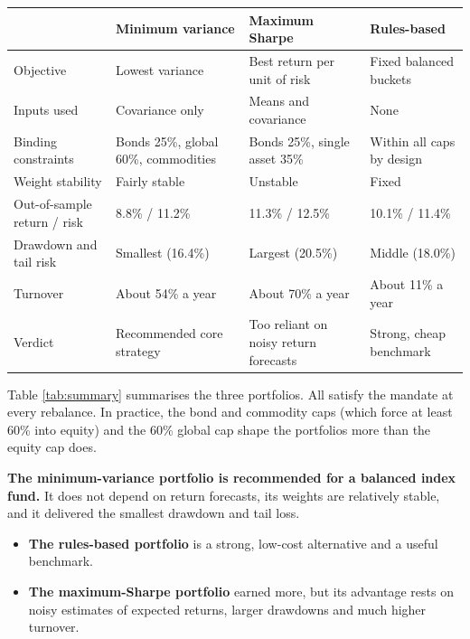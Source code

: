 \documentclass[11pt,preprint]{elsarticle}
\let\origtable\table
\let\endorigtable\endtable
\renewenvironment{table}[1][2] {
    \expandafter\origtable\expandafter[H]
} {
    \endorigtable
}
\numberwithin{equation}{section}
\numberwithin{figure}{section}
\numberwithin{table}{section}
\def\tightlist{} %
\begin{document}
\begin{table}[!htbp]
\centering
\caption{Summary of the three portfolios} 
\label{tab:summary}
\begingroup\scriptsize
\begin{tabular}{p{3.0cm}p{3.6cm}p{3.6cm}p{3.6cm}}
  \hline
  & Minimum variance & Maximum Sharpe & Rules-based \\ 
  \hline
Objective & Lowest variance & Best return per unit of risk & Fixed balanced buckets \\ 
  Inputs used & Covariance only & Means and covariance & None \\ 
  Binding constraints & Bonds 25\%, global 60\%, commodities & Bonds 25\%, single asset 35\% & Within all caps by design \\ 
  Weight stability & Fairly stable & Unstable & Fixed \\ 
  Out-of-sample return / risk & 8.8\% / 11.2\% & 11.3\% / 12.5\% & 10.1\% / 11.4\% \\ 
  Drawdown and tail risk & Smallest (16.4\%) & Largest (20.5\%) & Middle (18.0\%) \\ 
  Turnover & About 54\% a year & About 70\% a year & About 11\% a year \\ 
  Verdict & Recommended core strategy & Too reliant on noisy return forecasts & Strong, cheap benchmark \\ 
   \hline
\end{tabular}
\endgroup
\end{table}

Table \ref{tab:summary} summarises the three portfolios. All satisfy the
mandate at every rebalance. In practice, the bond and commodity caps
(which force at least 60\% into equity) and the 60\% global cap shape
the portfolios more than the equity cap does.

\textbf{The minimum-variance portfolio is recommended for a balanced
index fund.} It does not depend on return forecasts, its weights are
relatively stable, and it delivered the smallest drawdown and tail loss.

\begin{itemize}
\tightlist
\item
  \textbf{The rules-based portfolio} is a strong, low-cost alternative
  and a useful benchmark.
\item
  \textbf{The maximum-Sharpe portfolio} earned more, but its advantage
  rests on noisy estimates of expected returns, larger drawdowns and
  much higher turnover.
\end{itemize}
\end{document}
